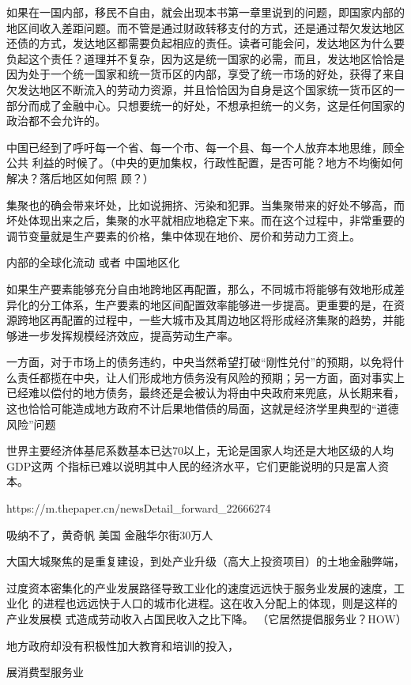 如果在一国内部，移民不自由，就会出现本书第一章里说到的问题，即国家内部的地区间收入差距问题。而不管是通过财政转移支付的方式，还是通过帮欠发达地区还债的方式，发达地区都需要负起相应的责任。读者可能会问，发达地区为什么要负起这个责任？道理并不复杂，因为这是统一国家的必需，而且，发达地区恰恰是因为处于一个统一国家和统一货币区的内部，享受了统一市场的好处，获得了来自欠发达地区不断流入的劳动力资源，并且恰恰因为自身是这个国家统一货币区的一部分而成了金融中心。只想要统一的好处，不想承担统一的义务，这是任何国家的政治都不会允许的。


中国已经到了呼吁每一个省、每一个市、每一个县、每一个人放弃本地思维，顾全公共
利益的时候了。（中央的更加集权，行政性配置，是否可能？地方不均衡如何解决？落后地区如何照
顾？）

集聚也的确会带来坏处，比如说拥挤、污染和犯罪。当集聚带来的好处不够高，而坏处体现出来之后，集聚的水平就相应地稳定下来。而在这个过程中，非常重要的调节变量就是生产要素的价格，集中体现在地价、房价和劳动力工资上。


内部的全球化流动 或者 中国地区化

如果生产要素能够充分自由地跨地区再配置，那么，不同城市将能够有效地形成差异化的分工体系，生产要素的地区间配置效率能够进一步提高。更重要的是，在资源跨地区再配置的过程中，一些大城市及其周边地区将形成经济集聚的趋势，并能够进一步发挥规模经济效应，提高劳动生产率。

一方面，对于市场上的债务违约，中央当然希望打破“刚性兑付”的预期，以免将什么责任都揽在中央，让人们形成地方债务没有风险的预期；另一方面，面对事实上已经难以偿付的地方债务，最终还是会被认为将由中央政府来兜底，从长期来看，这也恰恰可能造成地方政府不计后果地借债的局面，这就是经济学里典型的“道德风险”问题


世界主要经济体基尼系数基本已达70以上，无论是国家人均还是大地区级的人均GDP这两
个指标已难以说明其中人民的经济水平，它们更能说明的只是富人资本。

https://m.thepaper.cn/newsDetail_forward_22666274

吸纳不了，黄奇帆 美国 金融华尔街30万人

大国大城聚焦的是重复建设，到处产业升级（高大上投资项目）的土地金融弊端，

过度资本密集化的产业发展路径导致工业化的速度远远快于服务业发展的速度，工业化
的进程也远远快于人口的城市化进程。这在收入分配上的体现，则是这样的产业发展模
式造成劳动收入占国民收入之比下降。 （它居然提倡服务业？HOW）

地方政府却没有积极性加大教育和培训的投入，

展消费型服务业

